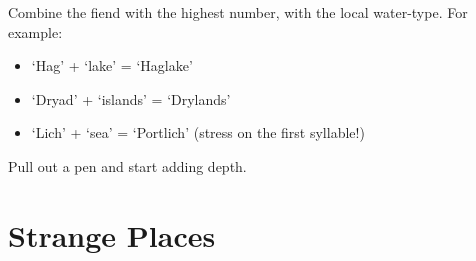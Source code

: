 \begin{multicols}{2}

Combine the fiend with the highest number, with the local water-type.
For example:

\begin{itemize}
\item
  `Hag' + `lake' = `Haglake'
\item
  `Dryad' + `islands' = `Drylands'
\item
  `Lich' + `sea' = `Portlich' (stress on the first syllable!)
\end{itemize}


Pull out a pen and start adding depth.

\end{multicols}

\section{Strange Places}

